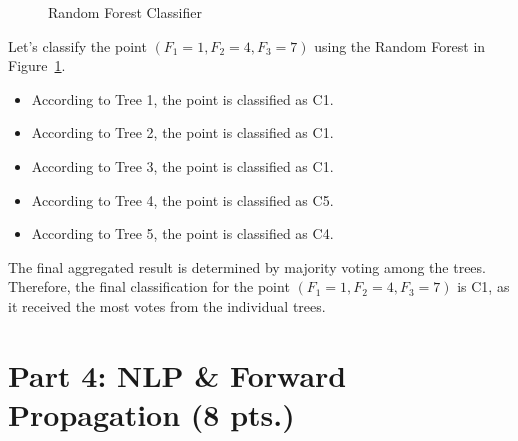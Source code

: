 \documentclass[12pt]{article}
\begin{document}
\begin{ejercicio}
\begin{figure}[h!]
{\begin{tikzpicture}
            \end{tikzpicture}
            }
            \caption{Random Forest Classifier}
            \label{fig:random_forest2}
        \end{figure}

        Let's classify the point $(F_1 = 1, F_2 = 4, F_3 = 7)$ using the Random Forest in Figure~\ref{fig:random_forest2}.
        \begin{itemize}
            \item According to Tree 1, the point is classified as C1.
            \item According to Tree 2, the point is classified as C1.
            \item According to Tree 3, the point is classified as C1.
            \item According to Tree 4, the point is classified as C5.
            \item According to Tree 5, the point is classified as C4.
        \end{itemize}

        The final aggregated result is determined by majority voting among the trees. Therefore, the final classification for the point $(F_1 = 1, F_2 = 4, F_3 = 7)$ is C1, as it received the most votes from the individual trees.
    \end{ejercicio}

    \newpage

    \section*{Part 4: NLP \& Forward Propagation (8 pts.)}
\end{document}
